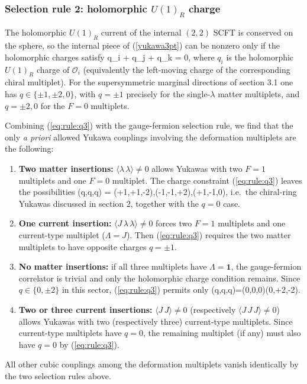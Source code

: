 \documentclass[12pt]{article}
\newcommand{\mc}[1]{\mathcal{#1}}
\begin{document}
\subsubsection*{Selection rule 2: holomorphic $U(1)_R$ charge}

The holomorphic $U(1)_R$ current of the internal $(2,2)$ SCFT is conserved on the sphere, so the internal piece of (\ref{yukawa3pt}) can be nonzero only if the holomorphic charges satisfy
\ie\label{eq:rule:q3}
q_i + q_j + q_k = 0,
\fe
where $q_i$ is the holomorphic $U(1)_R$ charge of $\mc{O}_i$ (equivalently the left-moving charge of the corresponding chiral multiplet). For the supersymmetric marginal directions of section 3.1 one has $q\in\{ \pm 1, \pm 2, 0\}$, with $q=\pm 1$ precisely for the single-$\lambda$ matter multiplets, and $q=\pm 2,0$ for the $F=0$ multiplets.

Combining (\ref{eq:rule:q3}) with the gauge-fermion selection rule, we find that the only \emph{a priori} allowed Yukawa couplings involving the deformation multiplets are the following:
\begin{enumerate}
\item {\bf Two matter insertions:} $\langle \lambda\,\lambda\rangle\neq 0$ allows Yukawas with two $F=1$ multiplets and one $F=0$ multiplet. The charge constraint (\ref{eq:rule:q3}) leaves the possibilities
\ie
(q,q,q) \;=\; (+1,+1,-2),\quad (-1,-1,+2),\quad (+1,-1,0),
\fe
i.e.\ the chiral-ring Yukawas discussed in section 2, together with the $q=0$ case.
\item {\bf One current insertion:} $\langle J\,\lambda\,\lambda\rangle\neq 0$ forces two $F=1$ multiplets and one current-type multiplet ($\Lambda=J$). Then (\ref{eq:rule:q3}) requires the two matter multiplets to have opposite charges $q=\pm 1$.
\item {\bf No matter insertions:} if all three multiplets have $\Lambda=\mathbf{1}$, the gauge-fermion correlator is trivial and only the holomorphic charge condition remains. Since $q\in\{0,\pm 2\}$ in this sector, (\ref{eq:rule:q3}) permits only
\ie
(q,q,q)\;=\;(0,0,0)\quad (0,+2,-2).
\fe
\item {\bf Two or three current insertions:} $\langle J\,J\rangle\neq 0$ (respectively $\langle J\,J\,J\rangle\neq 0$) allows Yukawas with two (respectively three) current-type multiplets. Since current-type multiplets have $q=0$, the remaining multiplet (if any) must also have $q=0$ by (\ref{eq:rule:q3}).
\end{enumerate}
All other cubic couplings among the deformation multiplets vanish identically by the two selection rules above.
\end{document}
